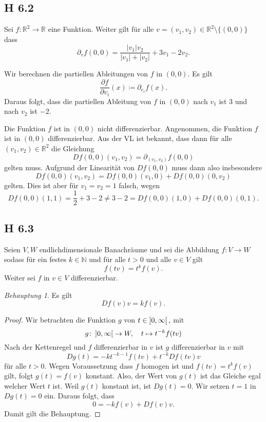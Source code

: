 \documentclass[draft,a5paper]{article}
\theoremstyle{remark}
\newtheorem*{beh}{Behauptung}
\newcommand{\interval}[1]{\mathinner{#1}}
\newcommand{\envert}[1]{\left\lvert#1\right\rvert}
\let\abs=\envert
\begin{document}
\subsection*{H 6.2}

Sei \(f\colon \mathbb{R}^{2} \to \mathbb{R}\) eine Funktion.  Weiter gilt für alle
\(v = (v_{1}, v_{2}) \in \mathbb{R}^{2}\setminus\{(0, 0)\}\) dass
\[\partial_{v}f(0, 0) = \frac{\abs{v_{1}}v_{2}}{\abs{v_{1}} + \abs{v_{2}}} +
  3v_{1} - 2v_{2}.\]

Wir berechnen die partiellen Ableitungen von \(f\) in \((0, 0)\).  Es
gilt
\[\frac{\partial f}{\partial v_{i}}(x) \coloneq \partial_{e_{i}}f(x).\] Daraus folgt, dass die
partiellen Ableitung von \(f\) in \((0, 0)\) nach \(v_{1}\) ist \(3\)
und nach \(v_{2}\) ist \(-2\).

Die Funktion \(f\) ist in \((0, 0)\) nicht differenzierbar.
Angenommen, die Funktion \(f\) ist in \((0, 0)\) differenzierbar.  Aus
der VL ist bekannt, dass dann für alle \((v_{1}, v_{2}) \in \mathbb{R}^{2}\) die
Gleichung
\[Df(0, 0)(v_{1}, v_{2}) = \partial_{(v_{1}, v_{2})}f(0, 0)\]
gelten muss.  Aufgrund der Linearität von \(Df(0, 0)\) muss dann also
insbesondere
\[Df(0, 0)(v_{1}, v_{2}) = Df(0, 0)(v_{1}, 0) + Df(0, 0)(0, v_{2})\]
gelten.  Dies ist aber für \(v_{1} = v_{2} = 1\) falsch, wegen
\[Df(0, 0)(1, 1) = \frac{1}{2} + 3 - 2 \ne 3 - 2 = Df(0, 0)(1, 0) +
  Df(0, 0)(0, 1).\]

\subsection*{H 6.3}

Seien \(V, W\) endlichdimensionale Banachräume und sei die Abbildung
\(f\colon V \to W \) sodass für ein festes
\(k \in \mathbb{N}\) und für alle \(t > 0\) und alle \(v \in V\) gilt
\[f(tv) = t^{k}f(v).\] Weiter sei \(f\) in \(v \in V \) differenzierbar.

\begin{beh}
  Es gilt \[Df(v)v = kf(v).\]
\end{beh}

\begin{proof}
  Wir betrachten die Funktion \(g\) von
  \(t \in \interval{]0, \infty[}, \) mit
  \[ g\colon \interval{]0, \infty[} \to W, \quad t \mapsto t^{-k}f(tv) \] Nach der
  Kettenregel und \(f\) differenzierbar in \(v\) ist \(g\)
  differenzierbar in \(v\) mit
  \[Dg(t) = -kt^{-k-1}f(tv) + t^{-k}Df(tv)v\] für alle \(t>0\).  Wegen
  Voraussetzung dass \(f\) homogen ist und \(f(tv) = t^{k}f(v)\) gilt,
  folgt \(g(t) = f(v)\) konstant. Also, der Wert von \(g(t)\) ist das
  Gleiche egal welcher Wert \(t\) ist.  Weil \(g(t)\) konstant ist,
  ist \(Dg(t) = 0\).  Wir setzen \(t=1\) in \(Dg(t) = 0\) ein.  Daraus
  folgt, dass
  \[0 = -kf(v) + Df(v)v. \] Damit gilt die Behauptung.
\end{proof}
\end{document}
